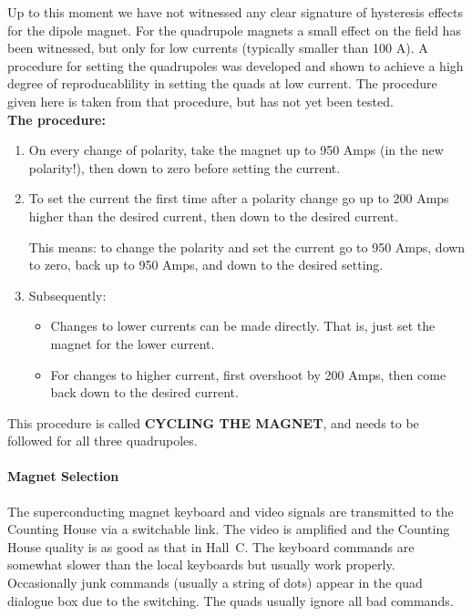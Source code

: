 Up to this moment we have not witnessed any clear signature of hysteresis
effects for the dipole magnet. For the quadrupole magnets a small effect
on the field has been witnessed, but only for low currents (typically smaller
than 100 A). A procedure for setting the quadrupoles was developed
and shown to achieve a high
degree of reproducablility in setting the quads at low current.  The procedure
given here is taken from that procedure, but has not yet  been tested.\\
\textbf{The procedure:} 
\begin{enumerate}
  \item{On every change of polarity, take the magnet up to 950 Amps 
     (in the new polarity!), then down to zero before setting the
     current.} 
  \item{To set the current the first time after a polarity change 
     go up to 200 Amps higher than the desired current, 
     then down to the desired current.

     This means: to change the polarity and set the current go to 950 Amps,
     down to zero, back up to 950 Amps, and down to the desired setting.}
  \item{Subsequently:
  \begin{itemize}
     \item{Changes to lower currents can be made directly. 
        That is, just set the magnet for the lower current.}
     \item{For changes to higher current, first overshoot 
        by 200 Amps, then come back down to the desired current.}
  \end{itemize}}
\end{enumerate} 
This procedure is called \textbf{CYCLING
THE MAGNET}, and needs to be  followed for all three quadrupoles.

\paragraph{Magnet Selection}

The superconducting magnet keyboard and video signals are transmitted to
the Counting House via a switchable link.  The video is amplified and
the Counting House quality is as good as that in Hall~C.  The keyboard
commands are somewhat slower than the local keyboards but usually work
properly.  Occasionally junk commands (usually a string of dots) appear
in the quad dialogue box due to the switching.  The quads usually ignore
all bad commands.

